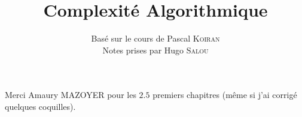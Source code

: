 \documentclass[knowledge]{../notes}
\title{Complexité Algorithmique}
\author{Basé sur le cours de Pascal \textsc{Koiran}\\ Notes prises par Hugo \textsc{Salou}}
\begin{document}
  \maketitle

  \dominitoc
  \tableofcontents

  \pagebreak

  Merci Amaury MAZOYER pour les $2.5$ premiers chapitres (même si j'ai corrigé quelques coquilles).

  \pagebreak

  
  
  
  
  
  
  
  
\end{document}
